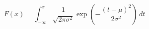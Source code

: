 \documentclass[preview]{standalone}
\begin{document}
\begin{center}
\[ F(x) = \int_{-\infty}^{x} \frac{1}{\sqrt{2\pi\sigma^2}} \exp\left(-\frac{(t - \mu)^2}{2\sigma^2}\right) \, dt \]
\end{center}
\end{document}
